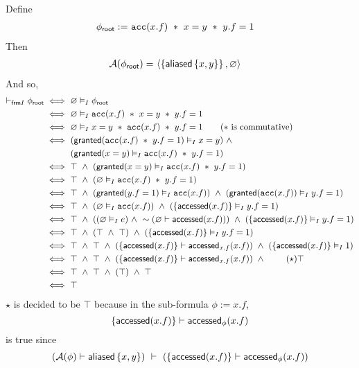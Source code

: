 Define
\begin{align*}
{\phi_\textsf{root}} := & \ \texttt{acc}(x.f) \ \ast \ x = y \ \ast \ y.f = 1
\end{align*}
Then
\begin{align*}
\mathcal{A}({\phi_\textsf{root}}) = & \ \langle  \left\{  \textsf{aliased}\left\{ x,y \right\} \right\} , \varnothing \rangle
\end{align*}
And so,
\begin{align*}
\selfframing \phiroot
\iff & \
\empty \frames \phiroot
\\ \iff & \
\empty \frames \cacc(x.f) \ \ast \ x = y \ \ast \ y.f = 1
\\ \iff & \
\empty \frames x = y \ \ast \ \cacc(x.f) \ \ast \ y.f = 1 \tag{$\ast$ is commutative}
\\ \iff & \
( \granted(\cacc(x.f) \ \ast \ y.f = 1) \frames x = y ) \ \land \\ & \
( \granted(x = y) \frames \cacc(x.f) \ \ast \ y.f = 1 )
\\ \iff & \
\top \ \land \ ( \granted(x = y) \frames \cacc(x.f) \ \ast \ y.f = 1 )
\\ \iff & \
\top \ \land \ ( \empty \frames \cacc(x.f) \ \ast \ y.f = 1 )
\\ \iff & \
\top \ \land \
( \granted(y.f = 1) \frames \cacc(x.f) ) \ \land \
( \granted(\cacc(x.f)) \frames y.f = 1 )
\\ \iff & \
\top \ \land \
( \empty \frames \cacc(x.f) ) \ \land \
( \set{\accessed(x.f)} \frames y.f = 1 )
\\ \iff & \
\top \ \land \
( (\empty \frames e) \ \land \ \pnot (\empty \entails \accessed(x.f)) ) \ \land \
( \set{\accessed(x.f)} \frames y.f = 1 )
\\ \iff & \
\top \ \land \
( \top \ \land \ \top) \ \land \
( \set{\accessed(x.f)} \frames y.f = 1 )
\\ \iff & \
\top \ \land \ \top \ \land \
( \set{\accessed(x.f)} \entails \accessed_{x.f}(x.f) ) \ \land \
( \set{\accessed(x.f)} \frames 1 )
\\ \iff & \
\top \ \land \ \top \ \land \
( \set{\accessed(x.f)} \entails \accessed_{x.f}(x.f) ) \ \land \ \tag{$\star$}
\top
\\ \iff & \
\top \ \land \ \top \ \land \
( \top ) \ \land \
\top
\\ \iff & \
\top
\end{align*}
$\star$ is decided to be $\top$ because in the sub-formula $\phi := x.f$,
$$
  \left\{ \textsf{accessed}(x.f) \right\} \vdash \textsf{accessed}_{\phi}(x.f)
$$
is true since
$$
  (\mathcal{A}(\phi) \vdash \textsf{aliased}\left\{ x,y \right\}) \ \vdash \ (\left\{ \textsf{accessed}(x.f) \right\} \vdash \textsf{accessed}_{\phi}(x.f))
$$


